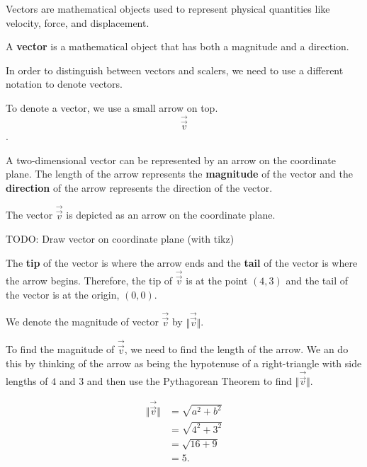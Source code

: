 \label{les_19:intro_to_vectors}

Vectors are mathematical objects used to represent physical quantities like
velocity, force, and displacement.

\begin{definition}[Vectors]
  \label{def:vectors}

  A \textbf{vector} is a mathematical object that has both a magnitude and a
  direction.
\end{definition}

In order to distinguish between vectors and scalers, we need to use a different
notation to denote vectors.

\begin{notation}
  To denote a vector, we use a small arrow on top.
  \[ \overrightarrow{\vec{v}} \].
\end{notation}

A two-dimensional vector can be represented by an arrow on the coordinate
plane. The length of the arrow represents the \textbf{magnitude} of the vector
and the \textbf{direction} of the arrow represents the direction of the vector.

\begin{example}
  \label{exm:vector}

  The vector $\overrightarrow{\vec{v}}$ is depicted as an arrow on the
  coordinate plane.

  TODO: Draw vector on coordinate plane (with tikz)

  The \textbf{tip} of the vector is where the arrow ends and the \textbf{tail}
  of the vector is where the arrow begins. Therefore, the tip of
  $\overrightarrow{\vec{v}}$ is at the point $(4,3)$ and the tail of the vector
  is at the origin, $(0,0)$.
\end{example}

\begin{notation}
  We denote the magnitude of vector $\overrightarrow{\vec{v}}$ by
  $\Vert \overrightarrow{\vec{v}} \Vert$.
\end{notation}

To find the magnitude of $\overrightarrow{\vec{v}}$, we need to find the length
of the arrow. We an do this by thinking of the arrow as being the hypotenuse of
a right-triangle with side lengths of $4$ and $3$ and then use the Pythagorean
Theorem to find $\Vert \overrightarrow{\vec{v}} \Vert$.

\begin{align*}
  \Vert \overrightarrow{\vec{v}} \Vert &= \sqrt{a^{2} + b^{2}} \\
                                       &= \sqrt{4^{2} + 3^{2}} \\
                                       &= \sqrt{16 + 9} \\
                                       &= 5
.\end{align*}

